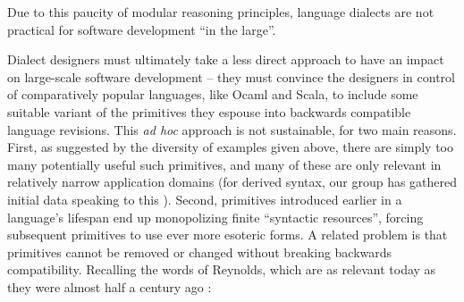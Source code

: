 Due to this paucity of modular reasoning principles, language dialects are not practical for software development ``in the large''. %

Dialect designers must ultimately take a less direct approach to have an impact on large-scale software development -- they must convince the designers in control of comparatively popular languages, like Ocaml and Scala, to include some suitable variant of the primitives they espouse into backwards compatible language revisions. %
This \emph{ad hoc} approach is not sustainable, for two main reasons. First, as suggested by the diversity of examples given above, there are simply too  many potentially useful such primitives, and many of these are only relevant in relatively narrow application domains (for derived syntax, our group has  gathered initial data speaking to this \cite{TSLs}). Second, primitives introduced earlier in a language's lifespan end up monopolizing finite ``syntactic resources'', forcing subsequent primitives to use ever more esoteric forms. A related problem is that primitives cannot be removed or changed without breaking backwards compatibility. %
Recalling the words of  Reynolds, which are as relevant today as they were almost half a century ago \cite{Reynolds70}:%
  

